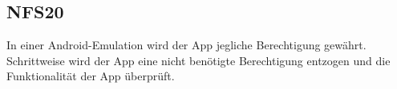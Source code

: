 \subsection*{NFS20}
In einer Android-Emulation wird der App jegliche Berechtigung gewährt.
Schrittweise wird der App eine nicht benötigte Berechtigung entzogen und die Funktionalität der App überprüft.